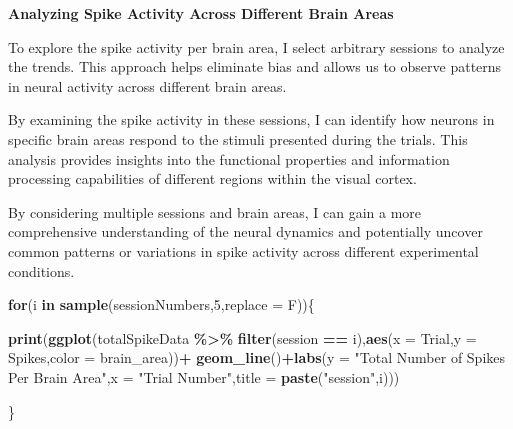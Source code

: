\documentclass[
]{article}
\newenvironment{Shaded}{\begin{snugshade}}{\end{snugshade}}
\newcommand{\AttributeTok}[1]{\textcolor[rgb]{0.13,0.29,0.53}{#1}}
\newcommand{\ControlFlowTok}[1]{\textcolor[rgb]{0.13,0.29,0.53}{\textbf{#1}}}
\newcommand{\DecValTok}[1]{\textcolor[rgb]{0.00,0.00,0.81}{#1}}
\newcommand{\FunctionTok}[1]{\textcolor[rgb]{0.13,0.29,0.53}{\textbf{#1}}}
\newcommand{\NormalTok}[1]{#1}
\newcommand{\SpecialCharTok}[1]{\textcolor[rgb]{0.81,0.36,0.00}{\textbf{#1}}}
\newcommand{\StringTok}[1]{\textcolor[rgb]{0.31,0.60,0.02}{#1}}
\begin{document}
\textbf{Analyzing Spike Activity Across Different Brain Areas}

To explore the spike activity per brain area, I select arbitrary
sessions to analyze the trends. This approach helps eliminate bias and
allows us to observe patterns in neural activity across different brain
areas.

By examining the spike activity in these sessions, I can identify how
neurons in specific brain areas respond to the stimuli presented during
the trials. This analysis provides insights into the functional
properties and information processing capabilities of different regions
within the visual cortex.

By considering multiple sessions and brain areas, I can gain a more
comprehensive understanding of the neural dynamics and potentially
uncover common patterns or variations in spike activity across different
experimental conditions.

\begin{Shaded}
\begin{Highlighting}[]
\ControlFlowTok{for}\NormalTok{(i }\ControlFlowTok{in} \FunctionTok{sample}\NormalTok{(sessionNumbers,}\DecValTok{5}\NormalTok{,}\AttributeTok{replace =}\NormalTok{ F))\{}
  
  \FunctionTok{print}\NormalTok{(}\FunctionTok{ggplot}\NormalTok{(totalSpikeData }\SpecialCharTok{\%\textgreater{}\%} \FunctionTok{filter}\NormalTok{(session }\SpecialCharTok{==}\NormalTok{ i),}\FunctionTok{aes}\NormalTok{(}\AttributeTok{x =}\NormalTok{ Trial,}\AttributeTok{y =}\NormalTok{ Spikes,}\AttributeTok{color =}\NormalTok{ brain\_area))}\SpecialCharTok{+} \FunctionTok{geom\_line}\NormalTok{()}\SpecialCharTok{+}\FunctionTok{labs}\NormalTok{(}\AttributeTok{y =} \StringTok{"Total Number of Spikes Per Brain Area"}\NormalTok{,}\AttributeTok{x =} \StringTok{"Trial Number"}\NormalTok{,}\AttributeTok{title =} \FunctionTok{paste}\NormalTok{(}\StringTok{"session"}\NormalTok{,i)))}

  
\NormalTok{\}}
\end{Highlighting}
\end{Shaded}
\end{document}

